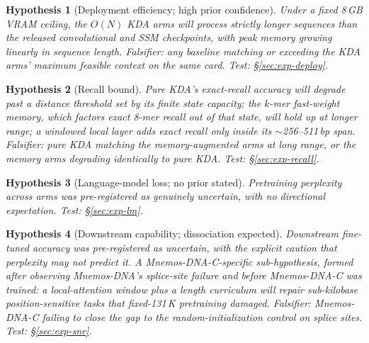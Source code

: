\documentclass[11pt]{article}
\theoremstyle{plain}
\newtheorem{hypothesis}{Hypothesis}
\begin{document}
\begin{hypothesis}[Deployment efficiency; high prior confidence]\label{hyp:eff}
Under a fixed 8\,GB VRAM ceiling, the $O(N)$ KDA arms will process strictly longer sequences than
the released convolutional and SSM checkpoints, with peak memory growing linearly in sequence
length. \emph{Falsifier:} any baseline matching or exceeding the KDA arms' maximum feasible
context on the same card. \emph{Test:} \S\ref{sec:exp-deploy}.
\end{hypothesis}

\begin{hypothesis}[Recall bound]\label{hyp:recall}
Pure KDA's exact-recall accuracy will degrade past a distance threshold set by its finite state
capacity; the $k$-mer fast-weight memory, which factors exact 8-mer recall out of that state,
will hold up at longer range; a windowed local layer adds exact recall only inside its
$\sim$256--511\,bp span. \emph{Falsifier:} pure KDA matching the memory-augmented arms at long
range, or the memory arms degrading identically to pure KDA. \emph{Test:} \S\ref{sec:exp-recall}.
\end{hypothesis}

\begin{hypothesis}[Language-model loss; no prior stated]\label{hyp:ppl}
Pretraining perplexity across arms was pre-registered as genuinely uncertain, with no directional
expectation. \emph{Test:} \S\ref{sec:exp-lm}.
\end{hypothesis}

\begin{hypothesis}[Downstream capability; dissociation expected]\label{hyp:down}
Downstream fine-tuned accuracy was pre-registered as uncertain, with the explicit caution that
perplexity may not predict it. A Mnemos-DNA-C-specific sub-hypothesis, formed after observing Mnemos-DNA's
splice-site failure and before Mnemos-DNA-C was trained: a local-attention window plus a length curriculum
will repair sub-kilobase position-sensitive tasks that fixed-131\,K pretraining damaged.
\emph{Falsifier:} Mnemos-DNA-C failing to close the gap to the random-initialization control on splice
sites. \emph{Test:} \S\ref{sec:exp-snr}.
\end{hypothesis}
\end{document}
